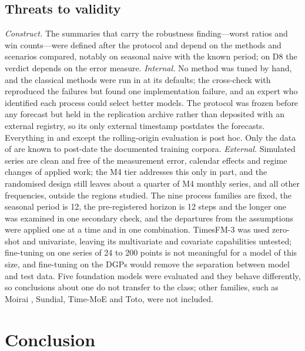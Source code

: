\subsection{Threats to validity}
\label{sec:limitations}

\emph{Construct.} The summaries that carry the robustness finding---worst ratios and win counts---were
defined after the protocol and depend on the methods and scenarios compared, notably on seasonal naive with the
known period; on D8 the verdict depends on the error measure. \emph{Internal.} No method was tuned by hand,
and the classical methods were run in  at its defaults; the cross-check with 
reproduced the failures but found one implementation failure, and an expert who identified each process
could select better models. The protocol was frozen before any forecast but held in the replication archive
rather than deposited with an external registry, so its only external timestamp postdates the forecasts.
Everything in  and  except the rolling-origin evaluation is
post hoc. Only the data of  are known to post-date the documented training
corpora. \emph{External.} Simulated
series are clean and free of the measurement error, calendar effects and regime changes of applied work; the
M4 tier addresses this only in part, and the randomised design still leaves about a quarter of M4 monthly
series, and all other frequencies, outside the regions studied. The nine process families are fixed, the
seasonal period is 12, the pre-registered horizon is 12 steps and the longer one was examined in one
secondary check, and the departures from the assumptions were applied one at a time and in one combination. TimesFM-3 was used
zero-shot and univariate, leaving its multivariate and covariate capabilities untested; fine-tuning on one
series of 24 to 200 points is not meaningful for a model of this size, and fine-tuning on the DGPs would remove
the separation between model and test data. Five foundation models were evaluated and they behave
differently, so conclusions about one do not transfer to the class; other families, such as Moirai
\citep{woo2024moirai, liu2025moirai2}, Sundial, Time-MoE and Toto, were not included.

\section{Conclusion}
\label{sec:conclusion}

